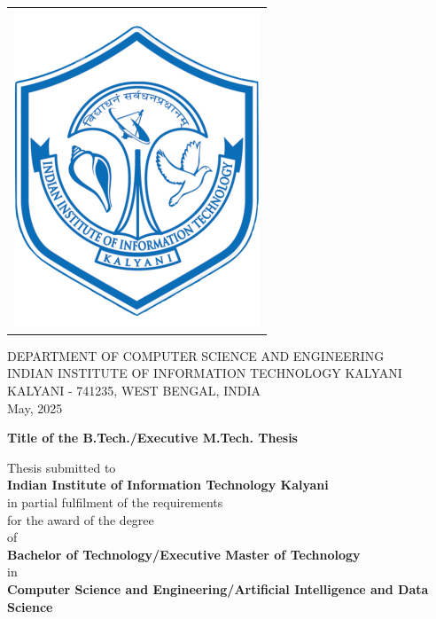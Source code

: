 \begin{center}
 \begin{tabular}{l}
 \includegraphics[width = 3.5 cm]{Figure/header/IIITK.png}
 \end{tabular}
\end{center}
\vspace{-0.3cm}
\begin{center}
\begin{large}
 \vspace{0.25cm}
 \hspace{-15mm} DEPARTMENT OF COMPUTER SCIENCE AND ENGINEERING\\
 \hspace{-15mm} INDIAN INSTITUTE OF INFORMATION TECHNOLOGY KALYANI\\
 KALYANI - 741235, WEST BENGAL, INDIA\\
 \vskip 50pt
 May, 2025
\end{large}
\end{center}


\newpage
\thispagestyle{empty}
\cleardoublepage
\pagestyle{empty}
\vspace*{-1.75cm}
\begin{center}
\begin{Large}
{\textbf{Title of the B.Tech./Executive M.Tech. Thesis}}\\
\end{Large}
\end{center}
\vspace{0.2cm}
\begin{center}
 \begin{large}
 Thesis  submitted to \\
 \vspace{0.2cm}
 \large{\textbf{Indian Institute of Information Technology Kalyani}}\\
 \vspace{0.1cm}
 in partial fulfilment of the requirements\\
 \vspace{0.1cm}
 for the award of the degree\\
 \vspace{0.3cm}
 of\\
 \vspace{0.3cm}
 \textbf{Bachelor of Technology/Executive Master of Technology}
 \vspace{0.3cm}
 \\in\\
 \vspace{0.3cm}
 \textbf{Computer Science and Engineering/Artificial Intelligence and Data Science}
 \end{large}
\end{center}

